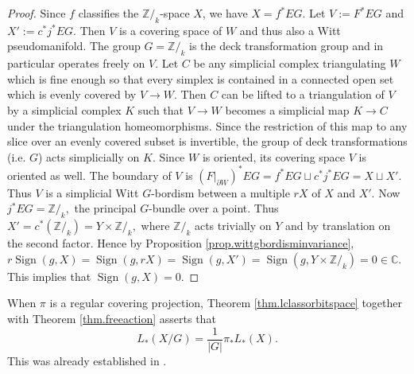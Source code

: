 \documentclass{amsart}
\theoremstyle{definition}
\theoremstyle{remark}
\newcommand {\intg}  {\ensuremath{\mathbb{Z}}}
\newcommand {\cplx}  {\ensuremath{\mathbb{C}}}
\newcommand {\Sign}    {{\ensuremath{\operatorname{Sign}}}}
\begin{document}
\begin{proof}
Since $f$ classifies the $\intg/_k$-space $X$, we have
$X = f^* EG$. 
Let $V := F^* EG$ and $X' := c^* j^* EG$.
Then $V$ is a covering space of $W$ and thus also a Witt pseudomanifold.
The group $G=\intg/_k$ is the deck transformation group and in particular
operates freely on $V$.
Let $C$ be any simplicial complex triangulating $W$ which is fine enough 
so that every simplex
is contained in a connected open set which is evenly covered by $V\to W$.
Then $C$ can be lifted to a triangulation of $V$ by a simplicial complex $K$
such that $V\to W$ becomes a simplicial map $K\to C$
under the triangulation homeomorphisms.
Since the restriction of this map to any slice over an evenly covered subset
is invertible, the group of
deck transformations (i.e. $G$) acts simplicially on $K$.
Since $W$ is oriented, its covering space $V$ is oriented as well.
The boundary of $V$ is 
$(F|_{\partial W})^* EG = f^* EG \sqcup c^* j^* EG = X \sqcup X'.$
Thus $V$ is a simplicial Witt $G$-bordism between a multiple $rX$ of $X$
and $X'$. Now $j^* EG = \intg/_k,$ the principal $G$-bundle over a point.
Thus
$X' = c^* (\intg/_k) = Y \times \intg/_k,$
where $\intg/_k$ acts trivially on $Y$ and by translation on the second factor.
Hence by Proposition \ref{prop.wittgbordisminvariance}, 
$r\Sign (g,X) = \Sign (g, rX) = \Sign (g,X') = \Sign (g,Y\times \intg/_k)=0 \in \cplx$.
This implies that $\Sign (g,X)=0$.
\end{proof}

When $\pi$ is a regular covering projection,
Theorem \ref{thm.lclassorbitspace} together with Theorem 
\ref{thm.freeaction} asserts that
\[ L_* (X/G) =  \frac{1}{|G|} \pi_* L_*(X). \] 
This was already established in \cite{banaglcovertransfer}.
\end{document}
